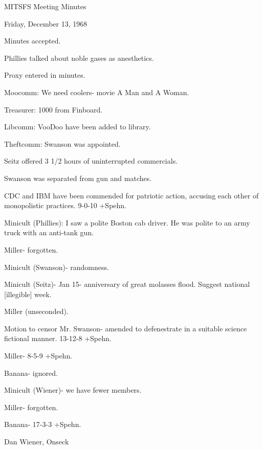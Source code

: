 \documentclass[12pt]{article}
\begin{document}
\begin{center}

MITSFS Meeting Minutes

Friday, December 13, 1968

\end{center}
 
\vspace{12pt}

\setlength{\parskip}{6pt}

\noindent
Minutes accepted.

Phillies talked about noble gases as anesthetics.

Proxy entered in minutes.

Moocomm: We need coolers- movie A Man and A Woman.

Treasurer: 1000 from Finboard.

Libcomm: VooDoo have been added to library.

Theftcomm: Swanson was appointed.

Seitz offered 3 1/2 hours of uninterrupted commercials.

Swanson was separated from gun and matches.

CDC and IBM have been commended for patriotic action, accusing each other of monopolistic practices. 9-0-10 +Spehn.

Minicult (Phillies): I saw a polite Boston cab driver. He was polite to an army truck with an anti-tank gun.

Miller- forgotten.

Minicult (Swanson)- randomness.

Minicult (Seitz)- Jan 15- anniversary of great molasses flood. Suggest national [illegible] week.

Miller (unseconded).

Motion to censor Mr. Swanson- amended to defenestrate in a suitable science fictional manner. 13-12-8 +Spehn.

Miller- 8-5-9 +Spehn.

Banana- ignored.

Minicult (Wiener)- we have fewer members.

Miller- forgotten.

Banana- 17-3-3 +Spehn.

\vspace{12pt}

\centerline{Dan Wiener, Onseck}
\end{document}

